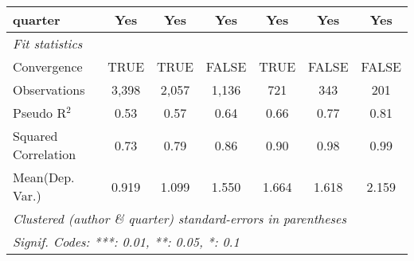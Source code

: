 \begin{tabular}{lcccccc}
   quarter                                                    & Yes          & Yes           & Yes           & Yes           & Yes          & Yes\\  
   \midrule
   \emph{Fit statistics}\\
   Convergence                                                &TRUE          & TRUE          & FALSE         & TRUE          & FALSE        & FALSE\\  
   Observations                                               & 3,398        & 2,057         & 1,136         & 721           & 343          & 201\\  
   Pseudo R$^2$                                               & 0.53         & 0.57          & 0.64          & 0.66          & 0.77         & 0.81\\  
   Squared Correlation                                        & 0.73         & 0.79          & 0.86          & 0.90          & 0.98         & 0.99\\  
Mean(Dep. Var.) & 0.919 & 1.099 & 1.550 & 1.664 & 1.618 & 2.159 \\
   \midrule \midrule
   \multicolumn{7}{l}{\emph{Clustered (author \& quarter) standard-errors in parentheses}}\\
   \multicolumn{7}{l}{\emph{Signif. Codes: ***: 0.01, **: 0.05, *: 0.1}}\\
\end{tabular}
\par\endgroup
